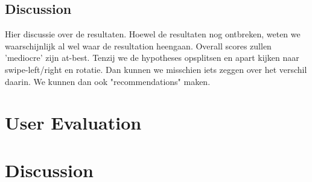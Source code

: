 \documentclass[11pt,a4paper]{article}
\begin{document}
\subsection{Discussion}
Hier discussie over de resultaten. Hoewel de resultaten nog ontbreken, weten we waarschijnlijk al wel waar de resultation heengaan. Overall scores zullen 'mediocre' zijn at-best. Tenzij we de hypotheses opsplitsen en apart kijken naar swipe-left/right en rotatie. Dan kunnen we misschien iets zeggen over het verschil daarin. We kunnen dan ook "recommendations" maken.








\section{User Evaluation}
\section{Discussion}

\end{document}
